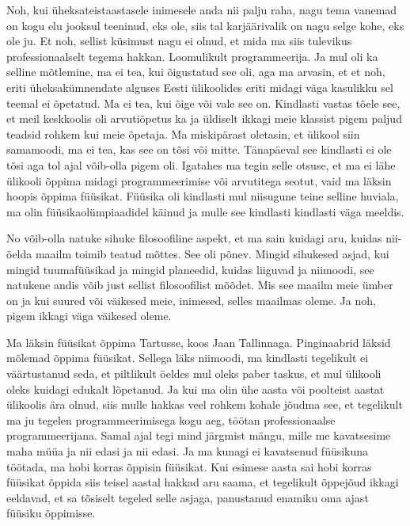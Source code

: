 
Noh, kui üheksateistaastasele inimesele anda nii palju raha, nagu tema vanemad 
on kogu elu jooksul teeninud, eks ole, siis tal karjäärivalik on nagu selge 
kohe, eks ole ju. Et noh, sellist küsimust nagu ei olnud, et mida ma siis 
tulevikus professionaalselt tegema hakkan. Loomulikult programmeerija.  Ja  mul 
oli ka selline mõtlemine, ma ei tea, kui õigustatud see oli, aga ma arvasin, et 
et noh, eriti üheksakümnendate alguses Eesti ülikoolides eriti midagi väga 
kasulikku sel teemal ei õpetatud. Ma ei tea,  kui õige või vale see on. 
Kindlasti vastas tõele see, et meil keskkoolis oli  arvutiõpetus ka ja üldiselt 
ikkagi meie klassist pigem paljud teadsid rohkem kui meie õpetaja. Ma 
miskipärast oletasin, et ülikool siin samamoodi, ma ei tea, kas see on tõsi või 
mitte. Tänapäeval see kindlasti ei ole tõsi aga  tol ajal  võib-olla pigem oli. 
Igatahes ma tegin selle otsuse, et ma ei lähe ülikooli õppima midagi 
programmeerimise või arvutitega seotut, vaid ma läksin hoopis õppima füüsikat. 
Füüsika oli kindlasti mul  niisugune teine selline huviala,  ma olin 
füüsikaolümpiaadidel käinud  ja mulle see kindlasti kindlasti väga meeldis. 


No võib-olla natuke sihuke filosoofiline aspekt, et ma sain kuidagi aru, kuidas 
nii-öelda maailm toimib teatud mõttes. See oli põnev. Mingid sihukesed asjad, kui 
 mingid tuumafüüsikad ja mingid planeedid, kuidas liiguvad ja niimoodi, see 
natukene andis võib just sellist filosoofilist mõõdet. Mis see maailm meie 
ümber on ja kui suured või väikesed meie, inimesed, selles maailmas  oleme.  Ja 
noh, pigem ikkagi väga väikesed oleme. 


Ma läksin  füüsikat õppima Tartusse, koos Jaan 
Tallinnaga. Pinginaabrid läksid mõlemad õppima 
füüsikat. Sellega läks niimoodi, ma kindlasti  tegelikult ei väärtustanud seda, 
et piltlikult öeldes mul oleks paber taskus, et mul ülikooli oleks  kuidagi 
edukalt lõpetanud. Ja kui ma olin ühe aasta või poolteist aastat ülikoolis ära 
olnud, siis mulle hakkas veel rohkem kohale jõudma see, et tegelikult ma ju 
tegelen programmeerimisega kogu aeg, töötan professionaalse programmeerijana. 
Samal ajal tegi mind järgmist mängu, mille me kavatsesime maha müüa ja nii 
edasi ja nii edasi. Ja ma kunagi ei kavatsenud füüsikuna töötada, ma hobi 
korras õppisin füüsikat. Kui esimese aasta sai hobi korras  füüsikat õppida 
siis teisel aastal hakkad aru saama, et tegelikult  õppejõud ikkagi eeldavad, 
et sa tõsiselt tegeled selle asjaga, panustanud enamiku oma ajast füüsiku 
õppimisse. 

